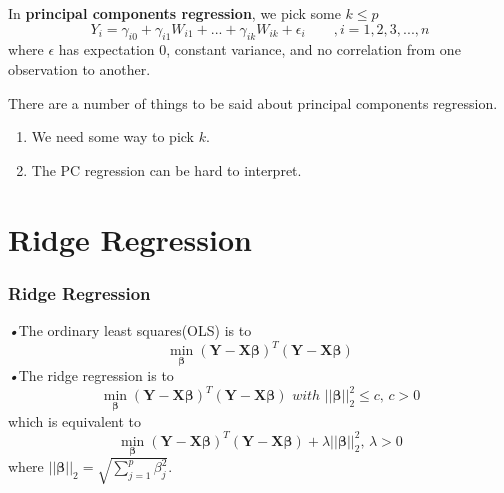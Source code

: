 \documentclass{beamer}
\begin{document}
\begin{frame}
In \textbf{principal components regression}, we pick some $k \leq p$
$$Y_i = \gamma_{i0}+\gamma_{i1}W_{i1}+...+\gamma_{ik}W_{ik}+\epsilon_i \qquad , i=1,2,3,...,n$$
where $\epsilon$ has expectation 0, constant variance, and no correlation from one observation to another.\\
\end{frame}

\begin{frame}
There are a number of things to be said about principal components regression.
\begin{enumerate}
\item We need some way to pick $k$.
\item The PC regression can be hard to interpret.
\end{enumerate}
\end{frame}

\section{Ridge Regression}

	 
	\begin{frame}
	\frametitle{Ridge Regression}
	\emph{•}The ordinary least squares(OLS) is to
	\begin{equation*}
	  \min\limits_{\boldsymbol{\beta}} (\boldsymbol{Y} - \boldsymbol{X}\boldsymbol{\beta} )^T(\boldsymbol{Y} - \boldsymbol{X}\boldsymbol{\beta} )
	\end{equation*} 
	\emph{•}The ridge regression is to 
	\begin{equation*}
	\min\limits_{\boldsymbol{\beta}} (\boldsymbol{Y} - \boldsymbol{X}\boldsymbol{\beta} )^T(\boldsymbol{Y} - \boldsymbol{X}\boldsymbol{\beta} )  \,\, with \,\, ||\boldsymbol{\beta}||_2^2 \leq c ,\,	 c > 0
	\end{equation*} 
	which is equivalent to 
	\begin{equation*}
	\min\limits_{\boldsymbol{\beta}} (\boldsymbol{Y} - \boldsymbol{X}\boldsymbol{\beta} )^T(\boldsymbol{Y} - \boldsymbol{X}\boldsymbol{\beta} ) + \lambda ||\boldsymbol{\beta}||_2^2 , \, \lambda > 0
	\end{equation*} 
	where $||\boldsymbol{\beta}||_2 = \sqrt{\sum_{j=1}^{p} \beta_j^2 }$.
	\end{frame}
\end{document}
